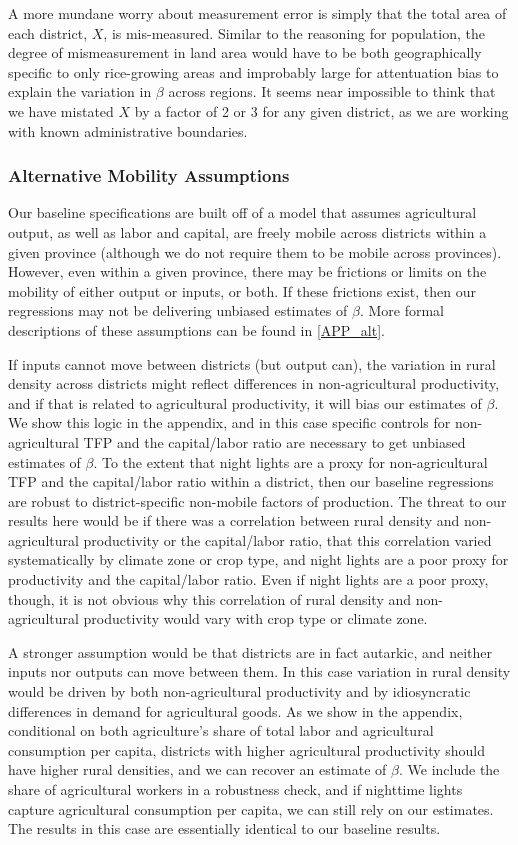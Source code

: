 \documentclass[11pt]{article}
\begin{document}
A more mundane worry about measurement error is simply that the total area of each district, $X$, is mis-measured. Similar to the reasoning for population, the degree of mismeasurement in land area would have to be both geographically specific to only rice-growing areas and improbably large for attentuation bias to explain the variation in $\beta$ across regions. It seems near impossible to think that we have mistated $X$ by a factor of 2 or 3 for any given district, as we are working with known administrative boundaries.

\subsubsection{Alternative Mobility Assumptions} 
Our baseline specifications are built off of a model that assumes agricultural output, as well as labor and capital, are freely mobile across districts within a given province (although we do not require them to be mobile across provinces). However, even within a given province, there may be frictions or limits on the mobility of either output or inputs, or both. If these frictions exist, then our regressions may not be delivering unbiased estimates of $\beta$. More formal descriptions of these assumptions can be found in \ref{APP_alt}.

If inputs cannot move between districts (but output can), the variation in rural density across districts might reflect differences in non-agricultural productivity, and if that is related to agricultural productivity, it will bias our estimates of $\beta$. We show this logic in the appendix, and in this case specific controls for non-agricultural TFP and the capital/labor ratio are necessary to get unbiased estimates of $\beta$. To the extent that night lights are a proxy for non-agricultural TFP and the capital/labor ratio within a district, then our baseline regressions are robust to district-specific non-mobile factors of production. The threat to our results here would be if there was a correlation between rural density and non-agricultural productivity or the capital/labor ratio, that this correlation varied systematically by climate zone or crop type, and night lights are a poor proxy for productivity and the capital/labor ratio. Even if night lights are a poor proxy, though, it is not obvious why this correlation of rural density and non-agricultural productivity would vary with crop type or climate zone.

A stronger assumption would be that districts are in fact autarkic, and neither inputs nor outputs can move between them. In this case variation in rural density would be driven by both non-agricultural productivity and by idiosyncratic differences in demand for agricultural goods. As we show in the appendix, conditional on both agriculture's share of total labor and agricultural consumption per capita, districts with higher agricultural productivity should have higher rural densities, and we can recover an estimate of $\beta$. We include the share of agricultural workers in a robustness check, and if nighttime lights capture agricultural consumption per capita, we can still rely on our estimates. The results in this case are essentially identical to our baseline results. 
\end{document}
